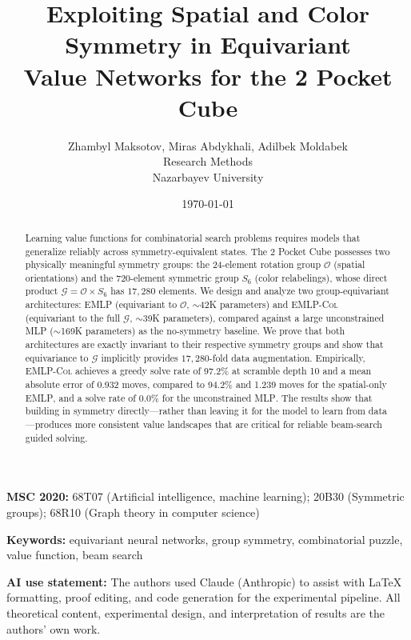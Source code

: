 \documentclass[11pt]{article}
\title{\textbf{Exploiting Spatial and Color Symmetry in Equivariant\\
Value Networks for the 2\texttimes2\texttimes2 Pocket Cube}}
\author{Zhambyl Maksotov, Miras Abdykhali, Adilbek Moldabek\\
\small Research Methods\\
\small Nazarbayev University}
\date{\today}
\begin{document}
\maketitle

\noindent\textbf{MSC 2020:} 68T07 (Artificial intelligence, machine learning);
20B30 (Symmetric groups);
68R10 (Graph theory in computer science)

\medskip
\noindent\textbf{Keywords:} equivariant neural networks, group symmetry,
combinatorial puzzle, value function, beam search

\medskip
\noindent\textbf{AI use statement:}
The authors used Claude (Anthropic) to assist with \LaTeX{} formatting,
proof editing, and code generation for the experimental pipeline.
All theoretical content, experimental design, and interpretation of results
are the authors' own work.

\begin{abstract}
Learning value functions for combinatorial search problems requires models
that generalize reliably across symmetry-equivalent states.
The 2 Pocket Cube possesses two physically meaningful
symmetry groups: the 24-element rotation group $\mathcal{O}$ (spatial
orientations) and the 720-element symmetric group $S_6$ (color relabelings),
whose direct product $\mathcal{G} = \mathcal{O} \times S_6$ has
$17{,}280$ elements.
We design and analyze two group-equivariant architectures:
\textsc{EMLP} (equivariant to $\mathcal{O}$, ${\sim}$42K parameters) and
\textsc{EMLP-Col} (equivariant to the full $\mathcal{G}$, ${\sim}$39K parameters),
compared against a large unconstrained \textsc{MLP} (${\sim}$169K
parameters) as the no-symmetry baseline.
We prove that both architectures are exactly invariant to their respective
symmetry groups and show that equivariance to $\mathcal{G}$ implicitly
provides $17{,}280$-fold data augmentation.
Empirically, \textsc{EMLP-Col} achieves a greedy
solve rate of 97.2\% at scramble depth 10 and a mean absolute error of
0.932 moves, compared to 94.2\% and 1.239 moves for the spatial-only
\textsc{EMLP}, and a solve rate of 0.0\% for the unconstrained \textsc{MLP}.
The results show that building in symmetry directly—rather than leaving it
for the model to learn from data—produces more consistent value landscapes
that are critical for reliable beam-search guided solving.
\end{abstract}
\end{document}
